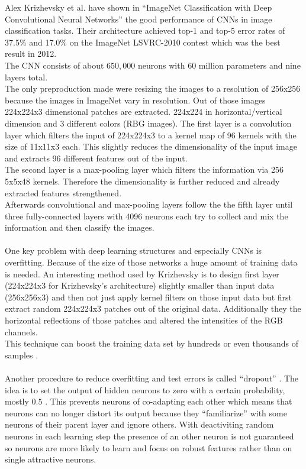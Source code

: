 \documentclass[12pt,twoside]{article}
\theoremstyle{plain}
\theoremstyle{definition}
\theoremstyle{remark}
\begin{document}
Alex Krizhevsky et al. have shown in \enquote{ImageNet Classification with Deep Convolutional Neural Networks} \cite{ImangeNetClassificationCNN-Krizhevsky} the good performance of CNNs in image classification tasks. Their architecture achieved top-1 and top-5 error rates of 37.5\% and 17.0\% on the ImageNet LSVRC-2010 contest which was the best result in 2012.
\\
The CNN consists of about $650,000$ neurons with $60$ million parameters and nine layers total.
\\
The only preproduction made were resizing the images to a resolution of 256x256 because the images in ImageNet vary in resolution. Out of those images 224x224x3 dimensional patches are extracted. 224x224 in horizontal/vertical dimension and 3 different colors (RBG images). The first layer is a convolution layer which filters the input of 224x224x3 to a kernel map of 96 kernels with the size of 11x11x3 each. This slightly reduces the dimensionality of the input image and extracts 96 different features out of the input.
\\
The second layer is a max-pooling layer which filters the information via 256 5x5x48 kernels. Therefore the dimensionality is further reduced and already extracted features strengthened.
\\
Afterwards convolutional and max-pooling layers follow the the fifth layer until three fully-connected layers with 4096 neurons each try to collect and mix the information and then classify the images.
\\
\\
One key problem with deep learning structures and especially CNNs is overfitting. Because of the size of those networks a huge amount of training data is needed. An interesting method used by Krizhevsky is to design first layer (224x224x3 for Krizhevsky's architecture) slightly smaller than input data (256x256x3) and then not just apply kernel filters on those input data but first extract random 224x224x3 patches out of the original data. Additionally they the horizontal reflections of those patches and altered the intensities of the RGB channels.
\\
This technique can boost the training data set by hundreds or even thousands of samples \cite{ImangeNetClassificationCNN-Krizhevsky}.
\\
\\
Another procedure to reduce overfitting and test errors is called \enquote{dropout} \cite{ImprovingNeuralNetworksDropout-Hinton-Krizhevsky}. The idea is to set the output of hidden neurons to zero with a certain probability, mostly $0.5$ \cite{ImangeNetClassificationCNN-Krizhevsky}. This prevents neurons of co-adapting each other which means that neurons can no longer distort its output because they \enquote{familiarize} with some neurons of their parent layer and ignore others. With deactiviting random neurons in each learning step the presence of an other neuron is not guaranteed so neurons are more likely to learn and focus on robust features rather than on single attractive neurons.
\end{document}
